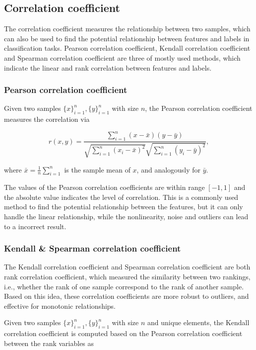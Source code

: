 \documentclass[11pt]{article}
\begin{document}
\subsection{Correlation coefficient}

The correlation coefficient measures the relationship between two samples, which can also be used to find the potential relationship between features and labels in classification tasks. Pearson correlation coefficient, Kendall correlation coefficient and Spearman correlation coefficient are three of mostly used methods, which indicate the linear and rank correlation between features and labels.

\subsubsection{Pearson correlation coefficient}

Given two samples $\{x\}_{i=1}^n, \{y\}_{i=1}^n$ with size $n$, the Pearson correlation coefficient measures the correlation via

$$
  r (x, y) = \frac{\sum_{i=1}^n (x - \bar{x}) (y - \bar{y})}{\sqrt{\sum_{i=1}^n (x_i - \bar{x})^2} \sqrt{\sum_{i=1}^n (y_i - \bar{y})^2}},
$$

\noindent where $\bar{x} = \frac{1}{n} \sum_{i=1}^n$ is the sample mean of $x$, and analogously for $\bar{y}$.

The values of the Pearson correlation coefficients are within range $[-1, 1]$ and the absolute value indicates the level of correlation. This is a commonly used method to find the potential relationship between the features, but it can only handle the linear relationship, while the nonlinearity, noise and outliers can lead to a incorrect result.

\subsubsection{Kendall \& Spearman correlation coefficient}

The Kendall correlation coefficient and Spearman correlation coefficient are both rank correlation coefficient, which measured the similarity between two rankings, i.e., whether the rank of one sample correspond to the rank of another sample. Based on this idea, these correlation coefficients are more robust to outliers, and effective for monotonic relationships.

Given two samples $\{x\}_{i=1}^n, \{y\}_{i=1}^n$ with size $n$ and unique elements, the Kendall correlation coefficient is computed based on the Pearson correlation coefficient between the rank variables as
\end{document}
